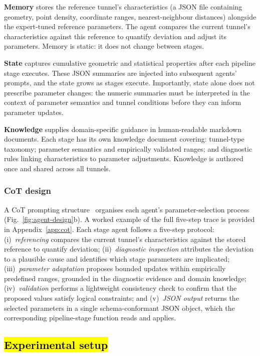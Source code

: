 \documentclass[a4paper,fleqn]{cas-dc}
\begin{document}
{\textbf{Memory} stores the reference tunnel's characteristics (a JSON file containing geometry, point density, coordinate ranges, nearest-neighbour distances) alongside the expert-tuned reference parameters. The agent compares the current tunnel's characteristics against this reference to quantify deviation and adjust its parameters. Memory is static: it does not change between stages.

\textbf{State} captures cumulative geometric and statistical properties after each pipeline stage executes. These JSON summaries are injected into subsequent agents' prompts, and the state grows as stages execute. Importantly, state alone does not prescribe parameter changes: the numeric summaries must be interpreted in the context of parameter semantics and tunnel conditions before they can inform parameter updates.

\textbf{Knowledge} supplies domain-specific guidance in human-readable markdown documents. Each stage has its own knowledge document covering: tunnel-type taxonomy; parameter semantics and empirically validated ranges; and diagnostic rules linking characteristics to parameter adjustments. Knowledge is authored once and shared across all tunnels. 

\subsubsection{CoT design}\label{sec:cot}

A CoT prompting structure~\cite{yao2023react} organises each agent's parameter-selection process (Fig.~\ref{fig:agent-design}b). A worked example of the full five-step trace is provided in Appendix~\ref{app:cot}. Each stage agent follows a five-step protocol: (i)~\emph{referencing} compares the current tunnel's characteristics against the stored reference to quantify deviation; (ii)~\emph{diagnostic inspection} attributes the deviation to a plausible cause and identifies which stage parameters are implicated; (iii)~\emph{parameter adaptation} proposes bounded updates within empirically predefined ranges, grounded in the diagnostic evidence and domain knowledge; (iv)~\emph{validation} performs a lightweight consistency check to confirm that the proposed values satisfy logical constraints; and (v)~\emph{JSON output} returns the selected parameters in a single schema-conformant JSON object, which the corresponding pipeline-stage function reads and applies. 

\subsection{\hl{Experimental setup}}\label{sec:exp-setup}

}
\end{document}
